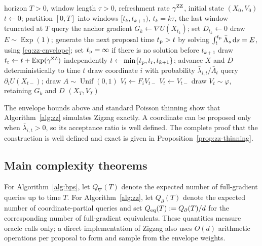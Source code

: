 \documentclass{amsart}
\theoremstyle{plain}
\theoremstyle{definition}
\theoremstyle{remark}
\newcommand{\ud}{\,\mathrm{d}}
\newcommand{\1}{\mathbf 1}
\newcommand{\dd}{\ud}
\newcommand{\zz}{{\rm ZZ}}
\begin{document}
\begin{algorithm}[htb]
\caption{Windowed thinning for Zigzag}\label{alg:zz}
\begin{algorithmic}[1]
\REQUIRE horizon $T>0$, window length $\tau>0$, refreshment rate
         $\gamma^{\zz}$, initial state $(X_0,V_0)$
\STATE $t\gets0$; partition $[0,T]$ into windows $[t_k,t_{k+1})$,
       $t_k=k\tau$, the last window truncated at $T$
\FOR{each nonempty window $[t_k,t_{k+1})$}
  \STATE query the anchor gradient $G_k\gets\nabla U(X_{t_k})$; set
         $D_{t_k}\gets0$
    \STATE draw $E\sim\operatorname{Exp}(1)$; generate the next proposal time
           $t_{\rm p}>t$ by solving
           $\int_t^{t_{\rm p}}\bar\Lambda_s\dd s=E$, using
           \eqref{eq:zz-envelope}; set $t_{\rm p}=\infty$ if there is no
           solution before $t_{k+1}$
    \STATE draw $t_{\rm r}\gets t+\operatorname{Exp}(\gamma^{\zz})$
           independently
    \STATE $t\gets\min\{t_{\rm p},t_{\rm r},t_{k+1}\}$; advance $X$ and $D$
           deterministically to time $t$
      \STATE draw coordinate $i$ with probability
             $\bar\lambda_{i,t}/\bar\Lambda_t$
      \STATE query $\partial_iU(X_{t-})$; draw
             $A\sim\operatorname{Unif}(0,1)$
      \IF{$A\le\lambda_i^{\zz}(X_{t-},V_{t-})/\bar\lambda_{i,t}$}
        \STATE $V_t\gets F_i V_{t-}$
      \ELSE
        \STATE $V_t\gets V_{t-}$
      \ENDIF
      \STATE draw $V_t\sim\varphi$, retaining $G_k$ and $D$
    \ENDIF
  \ENDWHILE
\ENDFOR
\RETURN $(X_T,V_T)$
\end{algorithmic}
\end{algorithm}

The envelope bounds above and standard Poisson thinning show that
Algorithm~\ref{alg:zz} simulates Zigzag exactly.  A coordinate can be
proposed only when $\bar\lambda_{i,t}>0$, so its acceptance ratio is well
defined.  The complete proof that the construction is well defined and exact
is given in
Proposition~\ref{prop:zz-thinning}.

\subsection{Main complexity theorems}\label{ssec:main-thms}

For Algorithm~\ref{alg:bps}, let $Q_\nabla(T)$ denote the expected number of
full-gradient queries up to time $T$.  For Algorithm~\ref{alg:zz}, let
$Q_\partial(T)$ denote the expected number of coordinate-partial queries and
set $Q_{\rm eq}(T):=Q_\partial(T)/d$ for the corresponding number of
full-gradient equivalents.  These quantities measure oracle calls only; a
direct implementation of Zigzag also uses $O(d)$ arithmetic operations per
proposal to form and sample from the envelope weights.
\end{document}
